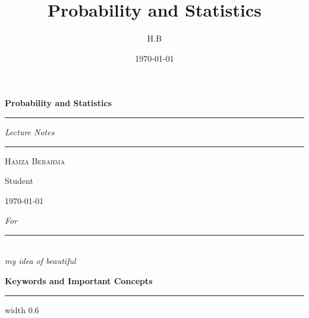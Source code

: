 \documentclass[12pt,a4paper]{book}
\title{\textbf{Probability and Statistics}}
\author{H.B}
\date{\today}
\begin{document}
\begin{titlepage}
    \centering
    \vspace*{2.5cm}
    {\Huge\bfseries Probability and Statistics\par}
    \vspace{1cm}
    \hrule
    \vspace{0.5cm}
    {\LARGE \textit{Lecture Notes}\par}
    \vspace{0.5cm}
    \hrule
    \vspace{2cm}
    {\Large \textsc{Hamza Berahma}\par}
    \vspace{0.5cm}
    {\large Student\par}
    \vfill
    {\large \today\par}
    \vspace{1cm}
\end{titlepage}

\cleardoublepage
\thispagestyle{empty}
\vspace*{6cm}
\begin{center}
    \emph{For} \\[0.5cm]
    \rule{1.5cm}{0.4pt}\\[0.5cm]
    \emph{my idea of beautiful}
\end{center}
\vfill

\frontmatter
\tableofcontents

\mainmatter





\backmatter

\cleardoublepage
{}
{}
\printindex

\cleardoublepage
\thispagestyle{empty}
\vspace*{1.5cm}
\begin{center}
    {\Huge\bfseries Keywords and Important Concepts}\\[0.5cm]
    \hrule width 0.6\textwidth
    \vspace{1.5cm}
\end{center}
\end{document}
